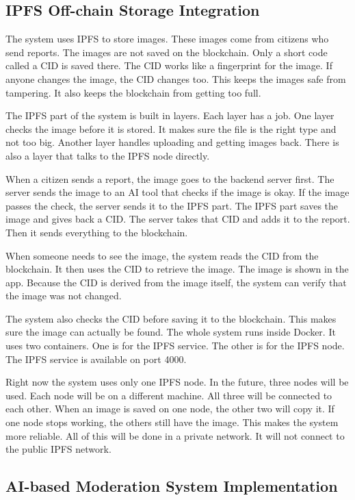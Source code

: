 \subsection{IPFS Off-chain Storage Integration}


The system uses IPFS to store images. These images come from citizens who send reports. The images are not saved on the blockchain. Only a short code called a CID is saved there. The CID works like a fingerprint for the image. If anyone changes the image, the CID changes too. This keeps the images safe from tampering. It also keeps the blockchain from getting too full.

The IPFS part of the system is built in layers. Each layer has a job. One layer checks the image before it is stored. It makes sure the file is the right type and not too big. Another layer handles uploading and getting images back. There is also a layer that talks to the IPFS node directly.

When a citizen sends a report, the image goes to the backend server first. The server sends the image to an AI tool that checks if the image is okay. If the image passes the check, the server sends it to the IPFS part. The IPFS part saves the image and gives back a CID. The server takes that CID and adds it to the report. Then it sends everything to the blockchain.

When someone needs to see the image, the system reads the CID from the blockchain. It then uses the CID to retrieve the image. The image is shown in the app. Because the CID is derived from the image itself, the system can verify that the image was not changed.

The system also checks the CID before saving it to the blockchain. This makes sure the image can actually be found. The whole system runs inside Docker. It uses two containers. One is for the IPFS service. The other is for the IPFS node. The IPFS service is available on port 4000.

Right now the system uses only one IPFS node. In the future, three nodes will be used. Each node will be on a different machine. All three will be connected to each other. When an image is saved on one node, the other two will copy it. If one node stops working, the others still have the image. This makes the system more reliable. All of this will be done in a private network. It will not connect to the public IPFS network.


\subsection{AI-based Moderation System Implementation}


